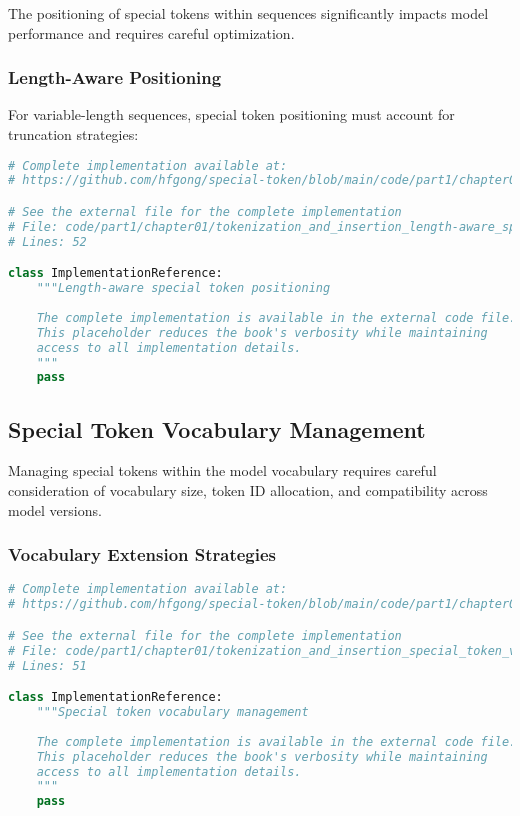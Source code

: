 The positioning of special tokens within sequences significantly impacts model performance and requires careful optimization.

\subsubsection{Length-Aware Positioning}

For variable-length sequences, special token positioning must account for truncation strategies:

\begin{lstlisting}[language=Python, caption={Length-aware special token positioning}]
# Complete implementation available at:
# https://github.com/hfgong/special-token/blob/main/code/part1/chapter01/tokenization_and_insertion_length-aware_special_token_pos.py

# See the external file for the complete implementation
# File: code/part1/chapter01/tokenization_and_insertion_length-aware_special_token_pos.py
# Lines: 52

class ImplementationReference:
    """Length-aware special token positioning
    
    The complete implementation is available in the external code file.
    This placeholder reduces the book's verbosity while maintaining
    access to all implementation details.
    """
    pass
\end{lstlisting}

\subsection{Special Token Vocabulary Management}

Managing special tokens within the model vocabulary requires careful consideration of vocabulary size, token ID allocation, and compatibility across model versions.

\subsubsection{Vocabulary Extension Strategies}

\begin{lstlisting}[language=Python, caption={Special token vocabulary management}]
# Complete implementation available at:
# https://github.com/hfgong/special-token/blob/main/code/part1/chapter01/tokenization_and_insertion_special_token_vocabulary_manag.py

# See the external file for the complete implementation
# File: code/part1/chapter01/tokenization_and_insertion_special_token_vocabulary_manag.py
# Lines: 51

class ImplementationReference:
    """Special token vocabulary management
    
    The complete implementation is available in the external code file.
    This placeholder reduces the book's verbosity while maintaining
    access to all implementation details.
    """
    pass
\end{lstlisting}

